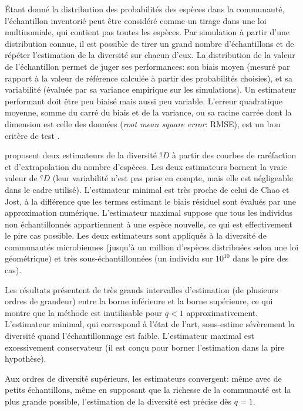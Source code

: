 \documentclass[
  11pt,
  french,
  a4paper,
  extrafontsizes,onecolumn,openright
  ]{memoir}
\newlength{\rf}
\begin{document}
Étant donné la distribution des probabilités des espèces dans la communauté, l'échantillon
inventorié peut être considéré comme un tirage dans une loi multinomiale, qui contient pas toutes les espèces.
Par simulation à partir d'une distribution connue, il est possible de tirer un grand nombre d'échantillons et de répéter l'estimation de la diversité sur chacun d'eux.
La distribution de la valeur de l'échantillon permet de juger ses performances: son biais moyen (mesuré par rapport à la valeur de référence calculée à partir des probabilités choisies), et sa variabilité (évaluée par sa variance empirique sur les simulations).
Un estimateur performant doit être peu biaisé mais aussi peu variable.
L'erreur quadratique moyenne, somme du carré du biais et de la variance, ou sa racine carrée dont la dimension est celle des données (\emph{root mean square error}: RMSE), est un bon critère de test \autocite[voir par exemple][figure 1]{Chao2013}.

\textcite{Haegeman2013} proposent deux estimateurs de la diversité \(^{q}\!D\) à partir des courbes de raréfaction et d'extrapolation du nombre d'espèces.
Les deux estimateurs bornent la vraie valeur de \(^{q}\!D\) (leur variabilité n'est pas prise en compte, mais elle est négligeable dans le cadre utilisé).
L'estimateur minimal est très proche de celui de Chao et Jost, à la différence que les termes estimant le biais résiduel sont évalués par une approximation numérique.
L'estimateur maximal suppose que tous les individus non échantillonnés appartiennent à une espèce nouvelle, ce qui est effectivement le pire cas possible.
Les deux estimateurs sont appliqués à la diversité de communautés microbiennes (jusqu'à un million d'espèces distribuées selon une loi géométrique) et très sous-échantillonnées (un individu sur \(10^{10}\) dans le pire des cas).

Les résultats présentent de très grands intervalles d'estimation (de plusieurs ordres de grandeur) entre la borne inférieure et la borne supérieure, ce qui montre que la méthode est inutilisable pour \(q<1\) approximativement.
L'estimateur minimal, qui correspond à l'état de l'art, sous-estime sévèrement la diversité quand l'échantillonnage est faible.
L'estimateur maximal est excessivement conservateur (il est conçu pour borner l'estimation dans la pire hypothèse).

Aux ordres de diversité supérieurs, les estimateurs convergent: même avec de petits échantillons, même en supposant que la richesse de la communauté est la plus grande possible, l'estimation de la diversité est précise dès \(q=1\).
\end{document}
